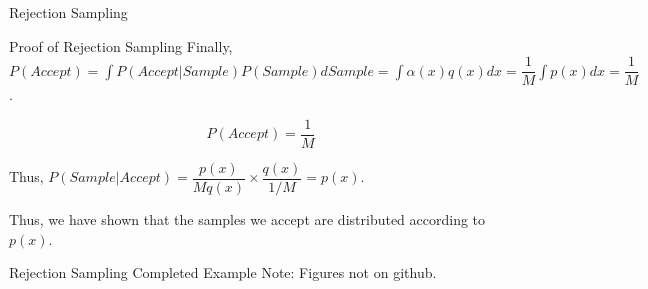 \documentclass{beamer}
\begin{document}
\begin{section}{Rejection Sampling}
\begin{frame}{Proof of Rejection Sampling}
        Finally, $P(Accept) = \int P(Accept|Sample) P(Sample) dSample = \int \alpha(x) q(x) dx = \dfrac{1}{M} \int p(x) dx = \dfrac{1}{M}$.
        \begin{tcolorbox}[colback=metropolisblue!5,colframe=metropolisblue,title={P(Accept)}]
            \begin{equation}
                P(Accept) = \frac{1}{M}
            \end{equation}
        \end{tcolorbox}
        

        Thus, $P(Sample|Accept) = \dfrac{p(x)}{M q(x)} \times \dfrac{q(x)}{1/M} = p(x)$.

        Thus, we have shown that the samples we accept are distributed according to $p(x)$.
        
    \end{frame}

    \begin{frame}{Rejection Sampling Completed Example}
        Note: Figures not on github.
    \end{frame}

        

        




\end{section}
\end{document}
